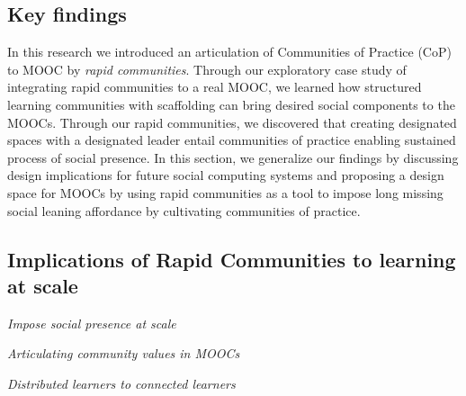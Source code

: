 \documentclass[manuscript,screen,review]{acmart}
\begin{document}
\subsection{Key findings}

In this research we introduced an articulation of Communities of Practice (CoP) to MOOC by \textit{rapid communities}.  Through our exploratory case study of integrating rapid communities to a real MOOC, we learned how structured learning communities with scaffolding can bring desired social components to the MOOCs. Through our rapid communities, we discovered that creating designated spaces with a designated leader entail communities of practice enabling sustained process of social presence.  In this section, we generalize our findings by discussing design implications for future social computing systems and proposing a design space for  MOOCs by using rapid communities as a tool to impose long missing social leaning affordance by cultivating communities of practice. 

\subsection{Implications of Rapid Communities to learning at scale}


\textit{Impose social presence at scale} 

\textit{Articulating community values in MOOCs} 

\textit{Distributed learners to connected learners} 

\end{document}
